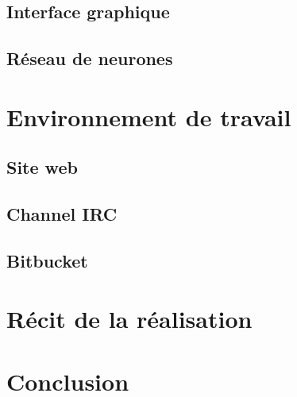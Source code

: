 \documentclass[12pt,a4paper]{article}
\begin{document}
\subsection{Interface graphique}

\newpage
\subsection{Réseau de neurones}

\newpage
\section{Environnement de travail}
\subsection{Site web}

\newpage
\subsection{Channel IRC}

\newpage
\subsection{Bitbucket}

\newpage
\section{Récit de la réalisation}

\newpage
\section{Conclusion}

\end{document}
